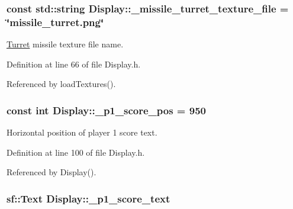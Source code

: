 \hypertarget{classDisplay_a4d984df72ac348f13c50357bc58ad797}{
\subsubsection[{\-\_\-missile\-\_\-turret\-\_\-texture\-\_\-file}]{\setlength{\rightskip}{0pt plus 5cm}const std\-::string Display\-::\-\_\-missile\-\_\-turret\-\_\-texture\-\_\-file = \char`\"{}missile\-\_\-turret.\-png\char`\"{}\hspace{0.3cm}{\ttfamily [private]}}}\label{classDisplay_a4d984df72ac348f13c50357bc58ad797}


\hyperlink{classTurret}{Turret} missile texture file name. 



Definition at line 66 of file Display.\-h.



Referenced by load\-Textures().

\hypertarget{classDisplay_af7115b9c3e4cdedf1398bcbdbf794270}{
\subsubsection[{\-\_\-p1\-\_\-score\-\_\-pos}]{\setlength{\rightskip}{0pt plus 5cm}const int Display\-::\-\_\-p1\-\_\-score\-\_\-pos = 950\hspace{0.3cm}{\ttfamily [private]}}}\label{classDisplay_af7115b9c3e4cdedf1398bcbdbf794270}


Horizontal position of player 1 score text. 



Definition at line 100 of file Display.\-h.



Referenced by Display().

\hypertarget{classDisplay_a0545991d352f9d4e7bda7d2f3b6a0236}{
\subsubsection[{\-\_\-p1\-\_\-score\-\_\-text}]{\setlength{\rightskip}{0pt plus 5cm}sf\-::\-Text Display\-::\-\_\-p1\-\_\-score\-\_\-text\hspace{0.3cm}{\ttfamily [private]}}}\label{classDisplay_a0545991d352f9d4e7bda7d2f3b6a0236}


